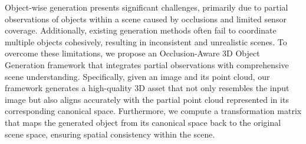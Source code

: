 Object-wise generation presents significant challenges, primarily due to partial observations of objects within a scene caused by occlusions and limited sensor coverage. Additionally, existing generation methods often fail to coordinate multiple objects cohesively, resulting in inconsistent and unrealistic scenes. To overcome these limitations, we propose an Occlusion-Aware 3D Object Generation framework that integrates partial observations with comprehensive scene understanding. 
Specifically, given an image and its point cloud, our framework generates a high-quality 3D asset that not only resembles the input image but also aligns accurately with the partial point cloud represented in its corresponding canonical space.
Furthermore, we compute a transformation matrix that maps the generated object from its canonical space back to the original scene space, ensuring spatial consistency within the scene.
% 
% 






